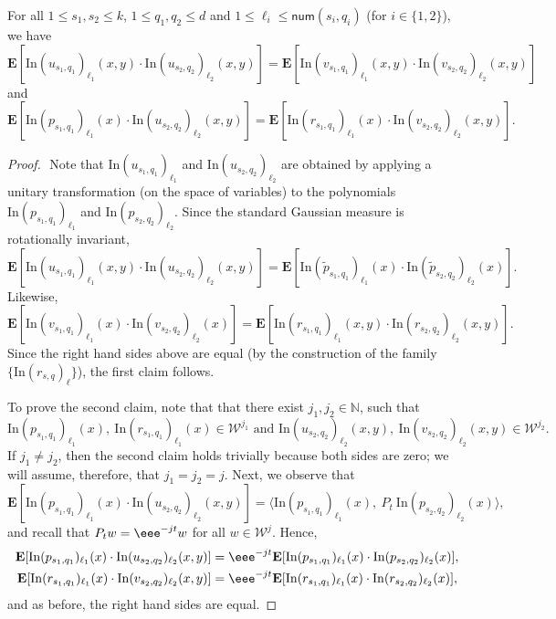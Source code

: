 \documentclass{toc}
\newcommand{\Inner}{\mathrm{In}}
\begin{document}
\begin{claim}\label{clm:const-corr}
For all $1 \le s_1, s_2 \le k$, $1 \le q_1, q_2 \le d$ and $1 \le \ell_i \le \mathsf{num}(s_i, q_i)$ (for $i \in \{1,2\}$), we have
\[
\mathbf{E}[\Inner(u_{s_1,q_1})_{\ell_1}(x,y) \cdot \Inner(u_{s_2,q_2})_{\ell_2}(x,y) ] = \mathbf{E}[\Inner(v_{s_1,q_1})_{\ell_1}(x,y) \cdot \Inner(v_{s_2,q_2})_{\ell_2}(x,y) ]
\]
and
\[
\mathbf{E}[\Inner(p_{s_1,q_1})_{\ell_1}(x) \cdot \Inner(u_{s_2,q_2})_{\ell_2}(x,y) ] = \mathbf{E}[\Inner(r_{s_1,q_1})_{\ell_1}(x) \cdot \Inner(v_{s_2,q_2})_{\ell_2}(x,y) ].
\]
\end{claim}
\begin{proof} $ $
Note that $\Inner(u_{s_1,q_1})_{\ell_1}$ and 
$\Inner(u_{s_2,q_2})_{\ell_2}$ are obtained by applying a unitary transformation (on the space of variables) to the polynomials $\Inner(p_{s_1,q_1})_{\ell_1}$ and 
$\Inner(p_{s_2,q_2})_{\ell_2}$. Since the standard Gaussian measure is rotationally invariant,
\[
\mathbf{E}[\Inner(u_{s_1,q_1})_{\ell_1}(x,y) \cdot \Inner(u_{s_2,q_2})_{\ell_2}(x,y) ] = \mathbf{E}[\Inner(\tilde p_{s_1,q_1})_{\ell_1}(x) \cdot \Inner(\tilde p_{s_2,q_2})_{\ell_2}(x) ].
\]
Likewise, 
\[
\mathbf{E}[\Inner(v_{s_1,q_1})_{\ell_1}(x) \cdot \Inner(v_{s_2,q_2})_{\ell_2}(x) ] = \mathbf{E}[\Inner(r_{s_1,q_1})_{\ell_1}(x,y) \cdot \Inner(r_{s_2,q_2})_{\ell_2}(x,y) ].
\]
Since the right hand sides above are equal (by the construction of the family $\{\Inner(r_{s,q})_{\ell}\}$), the first claim follows.

To prove the second claim, note that that there exist $j_1, j_2 \in \mathbb{N}$, such that 
$$
\Inner(p_{s_1,q_1})_{\ell_1}(x), \ \Inner(r_{s_1,q_1})_{\ell_1}(x) \in \mathcal{W}^{j_1} \text{ and } \Inner(u_{s_2,q_2})_{\ell_2}(x,y), \ \Inner(v_{s_2,q_2})_{\ell_2}(x,y) \in \mathcal{W}^{j_2}. 
$$
If $j_1 \ne j_2$, then the second claim holds trivially because both sides are zero;
we will assume, therefore, that $j_1 = j_2 = j$.
Next, we observe that 
\[
\mathbf{E}[\Inner(p_{s_1,q_1})_{\ell_1}(x) \cdot \Inner(u_{s_2,q_2})_{\ell_2}(x,y) ]  = \langle \Inner(p_{s_1,q_1})_{\ell_1}(x),\  P_t \  \Inner(p_{s_2,q_2})_{\ell_2}(x) \rangle,
\]
and recall that $P_t w = \eee^{-jt} w$ for all $w \in \mathcal{W}^j$. Hence,
\begin{align*}
    \mathbf{E}[\Inner(p_{s_1,q_1})_{\ell_1}(x) \cdot \Inner(u_{s_2,q_2})_{\ell_2}(x,y) ] &= \eee^{-jt} \mathbf{E}[\Inner(p_{s_1,q_1})_{\ell_1}(x) \cdot \Inner(p_{s_2,q_2})_{\ell_2}(x) ], \\
\mathbf{E}[\Inner(r_{s_1,q_1})_{\ell_1}(x) \cdot \Inner(v_{s_2,q_2})_{\ell_2}(x,y) ] 
                                                                                         &= \eee^{-jt} \mathbf{E}[\Inner(r_{s_1,q_1})_{\ell_1}(x) \cdot \Inner(r_{s_2,q_2})_{\ell_2}(x) ],
\end{align*}
and as before, the right hand sides are equal.
\end{proof}
\end{document}
